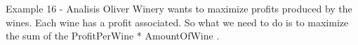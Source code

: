 \begin{frame}{Example 16 - Analisis}
Oliver Winery wants to maximize profits produced by the wines.
Each wine has a profit associated. So what we need to do is to
maximize the sum of the ProfitPerWine * AmountOfWine .
\end{frame}
